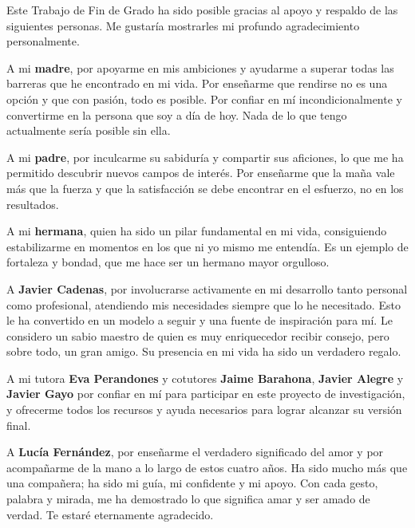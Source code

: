 \thispagestyle{empty}




\vspace{-1.8cm}

Este Trabajo de Fin de Grado ha sido posible gracias al apoyo y respaldo de las siguientes personas. Me gustaría mostrarles mi profundo agradecimiento personalmente.

A mi \textbf{madre}, por apoyarme en mis ambiciones y ayudarme a superar todas las barreras que he encontrado en mi vida. Por enseñarme que rendirse no es una opción y que con pasión, todo es posible. Por confiar en mí incondicionalmente y convertirme en la persona que soy a día de hoy. Nada de lo que tengo actualmente sería posible sin ella.

A mi \textbf{padre}, por inculcarme su sabiduría y compartir sus aficiones, lo que me ha permitido descubrir nuevos campos de interés. Por enseñarme que la maña vale más que la fuerza y que la satisfacción se debe encontrar en el esfuerzo, no en los resultados.

A mi \textbf{hermana}, quien ha sido un pilar fundamental en mi vida, consiguiendo estabilizarme en momentos en los que ni yo mismo me entendía. Es un ejemplo de fortaleza y bondad, que me hace ser un hermano mayor orgulloso.

A \textbf{Javier Cadenas}, por involucrarse activamente en mi desarrollo tanto personal como profesional, atendiendo mis necesidades siempre que lo he necesitado. Esto le ha convertido en un modelo a seguir y una fuente de inspiración para mí. Le considero un sabio maestro de quien es muy enriquecedor recibir consejo, pero sobre todo, un gran amigo. Su presencia en mi vida ha sido un verdadero regalo.

A mi tutora \textbf{Eva Perandones} y cotutores \textbf{Jaime Barahona}, \textbf{Javier Alegre} y \textbf{Javier Gayo} por confiar en mí para participar en este proyecto de investigación, y ofrecerme todos los recursos y ayuda necesarios para lograr alcanzar su versión final. 

A \textbf{Lucía Fernández}, por enseñarme el verdadero significado del amor y por acompañarme de la mano a lo largo de estos cuatro años. Ha sido mucho más que una compañera; ha sido mi guía, mi confidente y mi apoyo. Con cada gesto, palabra y mirada, me ha demostrado lo que significa amar y ser amado de verdad. Te estaré eternamente agradecido.